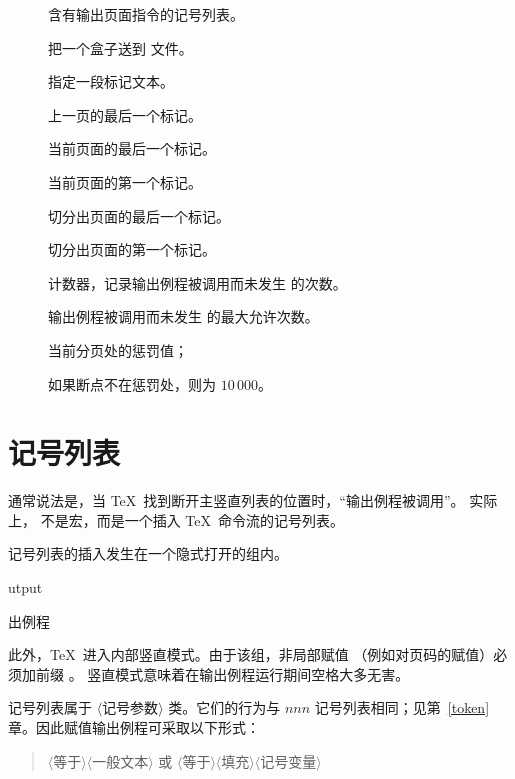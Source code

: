 \documentclass[a4paper]{rapport3}
\makeatletter
\def\gr#1{$\langle$#1$\rangle$}\def\key#1{{\tt#1}}
\def\alt{}\def\altt{}%
\newenvironment{disp}{\begin{quotation}}{\end{quotation}}
\newenvironment{inventory}{\begin{description}}{\end{description}}
\def\term#1\par{\index{#1}}
\def\cstoidx#1\par{\index{#1@\cs{#1}}}
\makeatother
\begin{document}
\begin{inventory}
\item [] 
      含有输出页面指令的记号列表。

\item [] 
      把一个盒子送到  文件。


\item [] 
      指定一段标记文本。

\item [] 
      上一页的最后一个标记。

\item [] 
      当前页面的最后一个标记。

\item [] 
      当前页面的第一个标记。

\item [] 
      切分出页面的最后一个标记。

\item [] 
      切分出页面的第一个标记。

\item [] 
      计数器，记录输出例程被调用而未发生  的次数。

\item [] 
      输出例程被调用而未发生  的最大允许次数。

\item [] 
      当前分页处的惩罚值；
 \alt
      如果断点不在惩罚处，则为 $10\,000$。

\end{inventory}


\section{\protect{} 记号列表}

通常说法是，当 \TeX\ 找到断开主竖直列表的位置时，“输出例程被调用”。
实际上， 不是宏，而是一个插入 \TeX\ 命令流的记号列表。

 记号列表的插入发生在一个隐式打开的组内。
\cstoidx output\par\term 输出例程\par
此外，\TeX\ 进入内部竖直模式。由于该组，非局部赋值
（例如对页码的赋值）必须加前缀 。
竖直模式意味着在输出例程运行期间空格大多无害。

 记号列表属于 \gr{记号参数} 类。它们的行为与
$nnn$ 记号列表相同；见第~\ref{token} 章。因此赋值输出例程可采取以下形式：
\begin{disp}\gr{等于}\gr{一般文本}\quad
或\quad 
{}\gr{等于}\gr{填充}\gr{记号变量}
\end{disp}
\end{document}
